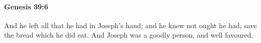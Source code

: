
		\paragraph{Genesis 39:6} %
			\label{GENESIS-39-6}

			And he left all that he had in Joseph's hand; and he knew not ought he had, save the bread which he did eat. And Joseph was a goodly person, and well favoured.


